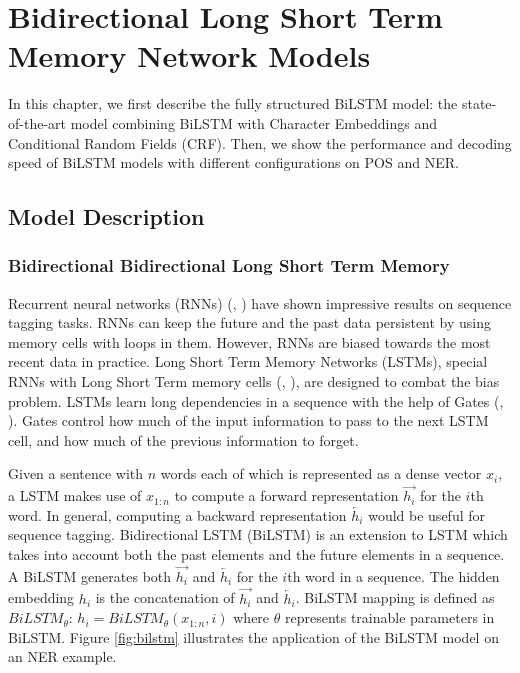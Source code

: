 \chapter{Bidirectional Long Short Term Memory Network Models}
In this chapter, we first describe the fully structured BiLSTM model: the state-of-the-art model combining BiLSTM with Character Embeddings and Conditional Random Fields (CRF). Then, we show the performance and decoding speed of BiLSTM models with different configurations on POS and NER.

\section{Model Description}
\subsection{Bidirectional Bidirectional Long Short Term Memory}

Recurrent neural networks (RNNs) (\citeauthor{mikolov2010recurrent}, \citeyear{mikolov2010recurrent}) have shown impressive results on sequence tagging tasks. RNNs can keep the future and the past data persistent by using memory cells with loops in them. However, RNNs are biased towards the most recent data in practice. Long Short Term Memory Networks (LSTMs), special RNNs with Long Short Term memory cells  (\citeauthor{graves2005framewise}, \citeyear{graves2005framewise}), are designed to combat the bias problem. LSTMs learn long dependencies in a sequence with the help of Gates (\citeauthor{graves2005framewise}, \citeyear{graves2005framewise}). Gates control how much of the input information to pass to the next LSTM cell, and how much of the previous information to forget.

Given a sentence with $n$ words each of which is represented as a dense vector $x_i$, a LSTM makes use of $x_{1:n}$ to compute a forward representation $\overrightarrow {h_{i}}$ for the $i$th word. In general, computing a backward representation $\overleftarrow {h_{i}}$ would be useful for sequence tagging. Bidirectional LSTM (BiLSTM) is an extension to LSTM which takes into account both the past elements and the future elements in a sequence. A BiLSTM generates both $\overrightarrow {h_{i}}$ and $\overleftarrow {h_{i}}$ for the $i$th word in a sequence. The hidden embedding $h_{i}$ is the concatenation of $\overrightarrow {h_{i}}$ and $\overleftarrow {h_{i}}$. BiLSTM mapping is defined as $BiLSTM_{\theta}$:
$h_{i} = BiLSTM_{\theta}\left(x_{1:n}, i\right)$ where $\theta$ represents trainable parameters in BiLSTM. Figure \ref{fig:bilstm} illustrates the application of the BiLSTM model on an NER example.

